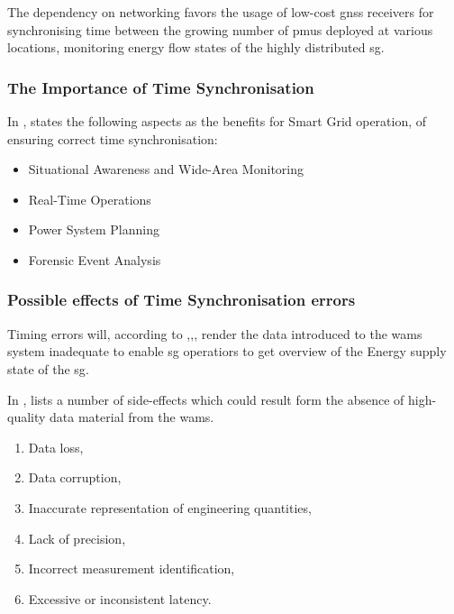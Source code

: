 The dependency on networking favors the usage of low-cost \acrshort{gnss} receivers for synchronising time between the growing number of \acrshort{pmu}s deployed at various locations, monitoring energy flow states of the highly distributed \acrshort{sg}. 



\subsubsection{The Importance of Time Synchronisation}

In \cite{dagle2019importance}, \citeauthor{dagle2019importance} states the following aspects as the benefits for Smart Grid operation, of ensuring correct time synchronisation:


\begin{itemize}
    \item  Situational Awareness and Wide-Area Monitoring
    \item  Real-Time Operations
    \item  Power System Planning 
    \item  Forensic Event Analysis
    
\end{itemize}

\subsubsection{Possible effects of Time Synchronisation errors}
Timing errors will, according to ,,, render the data introduced to the \acrshort{wams} system inadequate to enable \acrshort{sg} operatiors to get overview of the Energy supply state of the \acrshort{sg}.

In \Cite{martin2019impact}, \citeauthor{martin2019impact} lists a number of side-effects which could result form the absence of high-quality data material from the \acrshort{wams}.


\begin{enumerate}




    \item Data loss,
    \item Data corruption,
    \item Inaccurate representation of engineering quantities,
    \item Lack of precision,
    \item Incorrect measurement identification,
    \item Excessive or inconsistent latency.

\end{enumerate}


